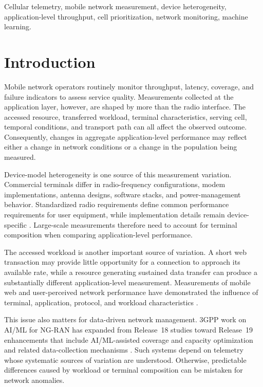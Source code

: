 \documentclass[conference]{IEEEtran}
\begin{document}
\begin{IEEEkeywords}
Cellular telemetry, mobile network measurement, device heterogeneity, application-level throughput, cell prioritization, network monitoring, machine learning.
\end{IEEEkeywords}

\section{Introduction}

Mobile network operators routinely monitor throughput, latency, coverage, and failure indicators to assess service quality. Measurements collected at the application layer, however, are shaped by more than the radio interface. The accessed resource, transferred workload, terminal characteristics, serving cell, temporal conditions, and transport path can all affect the observed outcome. Consequently, changes in aggregate application-level performance may reflect either a change in network conditions or a change in the population being measured.

Device-model heterogeneity is one source of this measurement variation. Commercial terminals differ in radio-frequency configurations, modem implementations, antenna designs, software stacks, and power-management behavior. Standardized radio requirements define common performance requirements for user equipment, while implementation details remain device-specific \cite{b1}. Large-scale measurements therefore need to account for terminal composition when comparing application-level performance.

The accessed workload is another important source of variation. A short web transaction may provide little opportunity for a connection to approach its available rate, while a resource generating sustained data transfer can produce a substantially different application-level measurement. Measurements of mobile web and user-perceived network performance have demonstrated the influence of terminal, application, protocol, and workload characteristics \cite{b2,b3,b4,b5}.

This issue also matters for data-driven network management. 3GPP work on AI/ML for NG-RAN has expanded from Release~18 studies toward Release~19 enhancements that include AI/ML-assisted coverage and capacity optimization and related data-collection mechanisms \cite{b6,b7}. Such systems depend on telemetry whose systematic sources of variation are understood. Otherwise, predictable differences caused by workload or terminal composition can be mistaken for network anomalies.
\end{document}
